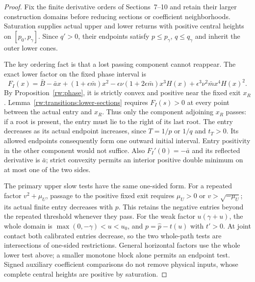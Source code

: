 \begin{proof}
Fix the finite derivative orders of Sections~7--10 and retain their
larger construction domains before reducing sections or coefficient
neighborhoods. Saturation supplies actual upper and lower returns
with positive central heights on $[p_0,p_\gamma]$.
Since $q'>0$, their endpoints satisfy $p\le p_\gamma$,
$q\le q_\gamma$ and inherit the outer lower cones.

The key ordering fact is that a lost passing component cannot reappear.
The exact lower factor on the fixed phase interval is
\[
 F_I(x)=\bar B-\bar ax+(1+\epsilon\bar m)x^2
 -\epsilon\nu(1+2\epsilon\bar m)x^3H(x)
 +\epsilon^3\nu^2\bar m x^4H(x)^2.
\]
By Proposition~\ref{rw:phase}, it is strictly convex and positive
near the fixed exit $x_R$. Lemma~\ref{rw:transitions:lower-sections}
requires $F_I(s)>0$ at every point between the actual entry and
$x_R$. Thus only the component adjoining $x_R$ passes: if a root
is present, the entry must lie to the right of its last root.
The entry decreases as its actual endpoint increases, since
$T=1/p$ or $1/q$ and $t_T>0$. Its allowed endpoints consequently
form one outward initial interval. Entry positivity in the other
component would not suffice. Also $F_I'(0)=-\bar a$ and its
reflected derivative is $\bar a$; strict convexity permits an
interior positive double minimum on at most one of the two sides.

The primary upper slow tests have the same one-sided form. For a repeated
factor $v^2+\mu_U$, passage to the positive fixed exit requires
$\mu_U>0$ or $v>\sqrt{-\mu_U}$; its actual finite entry decreases
with $p$. This retains the negative entries beyond the repeated
threshold whenever they pass. For the weak factor $u(\gamma+u)$,
the whole domain is $\max(0,-\gamma)<u<u_0$, and
$p=\hat p-t(u)$ with $t'>0$. At joint contact both calibrated
entries decrease, so the two whole-path tests are intersections
of one-sided restrictions. General horizontal factors use the
whole lower test above; a smaller monotone block alone permits
an endpoint test. Signed auxiliary coefficient comparisons do not
remove physical inputs, whose complete central heights are positive
by saturation.


\end{proof}
